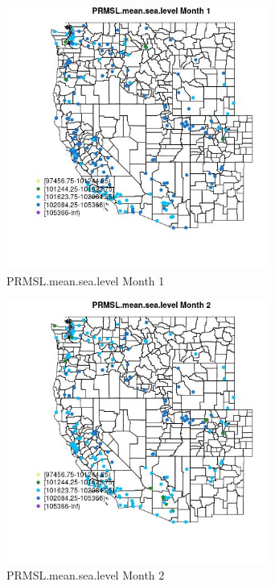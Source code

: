 \begin{figure} 
\centering  
\includegraphics[width=0.77\textwidth]{Code_Outputs/Report_ML_input_PM25_Step4_part_e_de_duplicated_aveswNAs_MapObsMo1PRMSLmeansealevel.jpg} 
\caption{\label{fig:Report_ML_input_PM25_Step4_part_e_de_duplicated_aveswNAsMapObsMo1PRMSLmeansealevel}PRMSL.mean.sea.level Month 1} 
\end{figure} 
 

\begin{figure} 
\centering  
\includegraphics[width=0.77\textwidth]{Code_Outputs/Report_ML_input_PM25_Step4_part_e_de_duplicated_aveswNAs_MapObsMo2PRMSLmeansealevel.jpg} 
\caption{\label{fig:Report_ML_input_PM25_Step4_part_e_de_duplicated_aveswNAsMapObsMo2PRMSLmeansealevel}PRMSL.mean.sea.level Month 2} 
\end{figure} 
 

